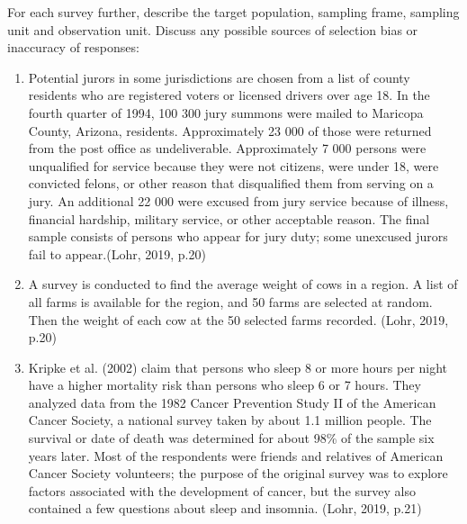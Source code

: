 \documentclass[12pt]{article}
\begin{document}
For each survey further, describe the target population, sampling frame, sampling unit and observation unit. Discuss any possible sources of selection bias or inaccuracy of responses:
\begin{enumerate}
\item Potential jurors in some jurisdictions are chosen from a list of county residents who are registered voters or licensed drivers over age 18. In the fourth quarter of 1994, 100 300 jury summons were mailed to Maricopa County, Arizona, residents. Approximately 23 000 of those were returned from the post office as undeliverable. Approximately 7 000 persons were unqualified for service because they were not citizens, were under 18, were convicted felons, or other reason that disqualified them from serving on a jury. An additional 22 000 were excused from jury service because of illness, financial
hardship, military service, or other acceptable reason. The final sample consists of persons who appear for jury duty; some unexcused jurors fail to appear.\hfill (Lohr, 2019, p.20)
\item A survey is conducted to find the average weight of cows in a region. A list of all farms is available for the region, and 50 farms are selected at random. Then the weight of each cow at the 50 selected farms recorded. \hfill (Lohr, 2019, p.20)
\item Kripke et al. (2002) claim that persons who sleep 8 or more hours per night have a higher mortality risk than persons who sleep 6 or 7 hours. They analyzed data from the 1982 Cancer Prevention Study II of the American Cancer Society, a national survey taken by about 1.1 million people. The survival or date of death was determined for about 98\% of the sample six years later. Most of the respondents were friends and relatives of American Cancer Society volunteers; the purpose of the original survey was to explore factors associated with the development of cancer, but the survey also contained a few questions about sleep and insomnia. \hfill (Lohr, 2019, p.21)

\end{enumerate}
\end{document}
